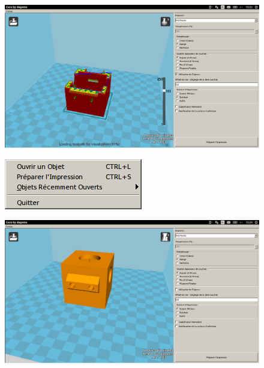 \documentclass{article}
\begin{document}
\begin{figure}[h!]
\centering
\includegraphics[scale=0.25]{./images/cura2.png}
\end{figure}\hfill 
\newpage
\begin{figure}[h!]
\centering
\includegraphics[scale=0.6]{./images/cura3.png}
\end{figure}\hfill 

\begin{figure}[h!]
\centering
\includegraphics[scale=0.25]{./images/cura5.png}
\end{figure}\hfill 
\end{document}
